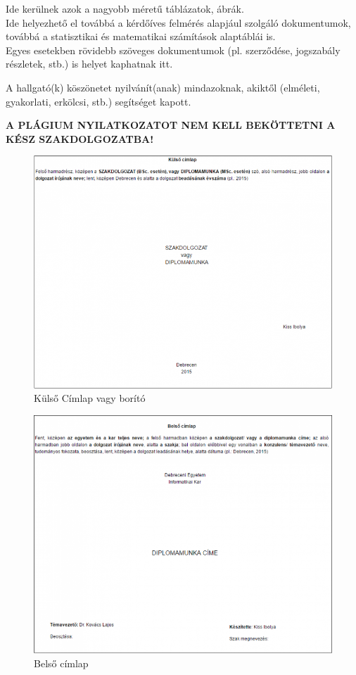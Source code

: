\documentclass[magyar,12pt,oneside]{article}
\begin{document}
\begin{description}[style=nextline]
\item[Függelék (maximum 8-10 oldal)]
Ide kerülnek azok a nagyobb méretű táblázatok, ábrák.\\
Ide helyezhető el továbbá a kérdőíves felmérés alapjául szolgáló dokumentumok, továbbá a statisztikai és matematikai számítások alaptáblái is.\\
Egyes esetekben rövidebb szöveges dokumentumok (pl. szerződése, jogszabály részletek, stb.) is helyet kaphatnak itt.
\item[Köszönetnyilvánítás]
A hallgató(k) köszönetet nyilvánít(anak) mindazoknak, akiktől (elméleti, gyakorlati, erkölcsi, stb.) segítséget kapott.

\end{description}

\textbf{A PLÁGIUM NYILATKOZATOT NEM KELL BEKÖTTETNI A KÉSZ SZAKDOLGOZATBA!}

\appendix

\begin{figure}[!ht]
	\includegraphics[width=\linewidth,keepaspectratio]{cimlap_kulso.png}
	\caption{Külső Címlap vagy borító}
\end{figure}
\begin{figure}[!ht]
	\includegraphics[width=\linewidth,keepaspectratio]{cimlap_belso.png}
	\caption{Belső címlap}
\end{figure}
\end{document}
